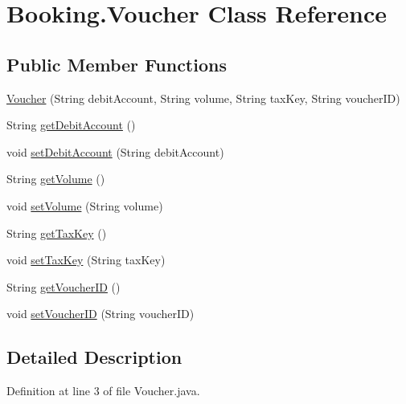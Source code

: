 \hypertarget{class_booking_1_1_voucher}{\section{Booking.\-Voucher Class Reference}
\label{class_booking_1_1_voucher}
}
\subsection*{Public Member Functions}
\begin{DoxyCompactItemize}
\item 
\hyperlink{class_booking_1_1_voucher_a881680476cac22ad99e26c52193a4f5c}{Voucher} (String debit\-Account, String volume, String tax\-Key, String voucher\-I\-D)
\item 
String \hyperlink{class_booking_1_1_voucher_a4b942f6a41a9038f54196e667a7688c7}{get\-Debit\-Account} ()
\item 
void \hyperlink{class_booking_1_1_voucher_af2c5d763ce31b68b1ed7f92c844e4c49}{set\-Debit\-Account} (String debit\-Account)
\item 
String \hyperlink{class_booking_1_1_voucher_ac2eb353f82c098d06328fbbe825ba741}{get\-Volume} ()
\item 
void \hyperlink{class_booking_1_1_voucher_a5b5777ab768d3749fe5daa725fa5a507}{set\-Volume} (String volume)
\item 
String \hyperlink{class_booking_1_1_voucher_a3885a881d074c6345416f00c5cb98363}{get\-Tax\-Key} ()
\item 
void \hyperlink{class_booking_1_1_voucher_a1d1f825e65f9fd2b359f003c6cfb6f4f}{set\-Tax\-Key} (String tax\-Key)
\item 
String \hyperlink{class_booking_1_1_voucher_a6079148db64db2ff733814b62da06aaa}{get\-Voucher\-I\-D} ()
\item 
void \hyperlink{class_booking_1_1_voucher_a0e52da265a43c2ef797fcd1612f597ff}{set\-Voucher\-I\-D} (String voucher\-I\-D)
\end{DoxyCompactItemize}


\subsection{Detailed Description}


Definition at line 3 of file Voucher.\-java.



